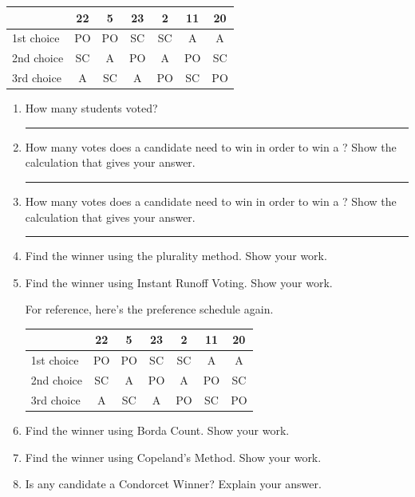 \documentclass[12pt]{article}
\newcommand{\ans}[1][1in]{\rule{#1}{.5pt}}
\begin{document}
\begin{center}
\begin{tabular}{l || c|c|c|c|c|c}
&22&5&23&2&11&20\\
\hline \hline
1st choice& PO&PO&SC&SC&A&A\\
\hline
2nd choice&SC&A&PO&A&PO&SC\\
\hline
3rd choice&A&SC&A&PO&SC&PO
\end{tabular}
\end{center}
\begin{enumerate}
	\item How many students voted? \ans
	
	\bigskip
	\item How many votes does a candidate need to win in order to win a ? Show the calculation that gives your answer.
	\ans
	
	\bigskip

	\item How many votes does a candidate need to win in order to win a ? Show the calculation that gives your answer.
	\ans
	
	\bigskip

	\item Find the winner using the plurality method. Show your work.
	\vfill
	\item Find the winner using Instant Runoff Voting.  Show your work.
	\vfill
	
	\vfill
	\newpage
	
	For reference, here's the preference schedule again. 
	
	\begin{center}
\begin{tabular}{l || c|c|c|c|c|c}
&22&5&23&2&11&20\\
\hline \hline
1st choice& PO&PO&SC&SC&A&A\\
\hline
2nd choice&SC&A&PO&A&PO&SC\\
\hline
3rd choice&A&SC&A&PO&SC&PO
\end{tabular}
\end{center}
	\item Find the winner using Borda Count.  Show your work.
	\vfill
	\item Find the winner using Copeland's Method. Show your work.
	\vfill
	\item Is any candidate a Condorcet Winner? Explain your answer.	
	\vfill
	\end{enumerate}
	
	\newpage
	
\end{document}
